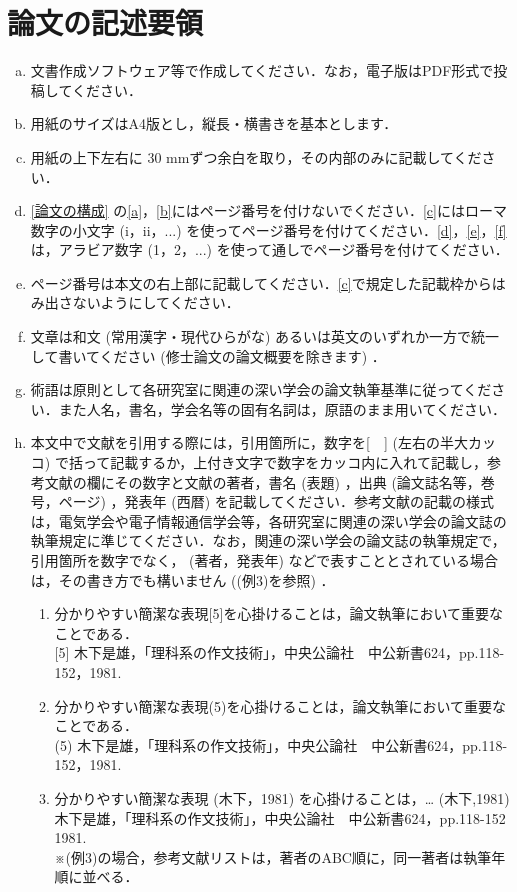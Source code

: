 \documentclass{kupaper}
\begin{document}
\chapter{論文の記述要領}
\begin{enumerate}[a.]
	\item 文書作成ソフトウェア等で作成してください．なお，電子版はPDF形式で投稿してください．
	\item 用紙のサイズはA4版とし，縦長・横書きを基本とします．
	\item 用紙の上下左右に 30 mmずつ余白を取り，その内部のみに記載してください．
	\item \ref{論文の構成} の\ref{a}，\ref{b}にはページ番号を付けないでください．\ref{c}にはローマ数字の小文字 (i，ii，...) を使ってページ番号を付けてください．\ref{d}，\ref{e}，\ref{f}は，アラビア数字 (1，2，...) を使って通しでページ番号を付けてください．
	\item ページ番号は本文の右上部に記載してください．\ref{c}で規定した記載枠からはみ出さないようにしてください．
	\item 文章は和文 (常用漢字・現代ひらがな) あるいは英文のいずれか一方で統一して書いてください (修士論文の論文概要を除きます) ．
	\item 術語は原則として各研究室に関連の深い学会の論文執筆基準に従ってください．また人名，書名，学会名等の固有名詞は，原語のまま用いてください．
	\item 本文中で文献を引用する際には，引用箇所に，数字を[　] (左右の半大カッコ) で括って記載するか，上付き文字で数字をカッコ内に入れて記載し，参考文献の欄にその数字と文献の著者，書名 (表題) ，出典 (論文誌名等，巻号，ページ) ，発表年 (西暦) を記載してください．参考文献の記載の様式は，電気学会や電子情報通信学会等，各研究室に関連の深い学会の論文誌の執筆規定に準じてください．なお，関連の深い学会の論文誌の執筆規定で，引用箇所を数字でなく， (著者，発表年) などで表すこととされている場合は，その書き方でも構いません ((例3)を参照) ．
	      	      
	      \begin{enumerate}[(例1)]
	      	\item 
	      	      分かりやすい簡潔な表現[5]を心掛けることは，論文執筆において重要なことである．\\
	      	      {[5]} 木下是雄，「理科系の作文技術」，中央公論社　中公新書624，pp.118-152，1981.
	      	\item 
	      	      分かりやすい簡潔な表現(5)を心掛けることは，論文執筆において重要なことである．\\
	      	      (5) 木下是雄，「理科系の作文技術」，中央公論社　中公新書624，pp.118-152，1981.
	      	\item \label{例3}
	      	      分かりやすい簡潔な表現 (木下，1981) を心掛けることは，…
	      	      (木下,1981)  \\
	      	      木下是雄，「理科系の作文技術」，中央公論社　中公新書624，pp.118-152 1981.\\
	      	      ※(例3)の場合，参考文献リストは，著者のABC順に，同一著者は執筆年順に並べる．
	      \end{enumerate}
	      	      

\end{enumerate}
\end{document}
